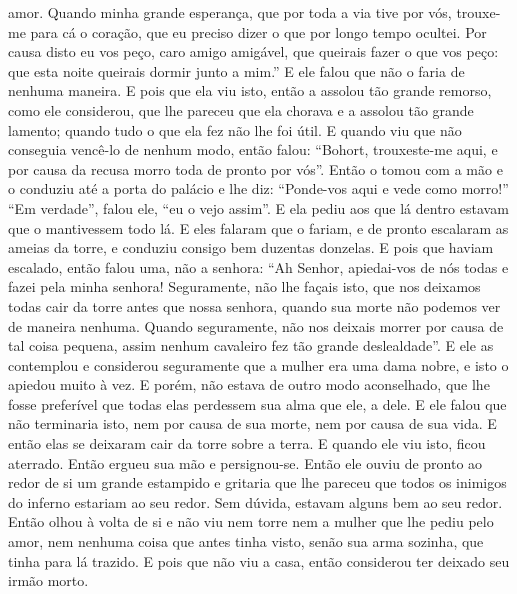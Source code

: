 amor. Quando minha grande esperança, que por toda a via tive por vós, trouxe-me
para cá o coração, que eu preciso dizer o que por longo tempo ocultei. Por
causa disto eu vos peço, caro amigo amigável, que queirais fazer o que vos
peço: que esta noite queirais dormir junto a mim.” E ele falou que não o faria
de nenhuma maneira. E pois que ela viu isto, então a assolou tão grande
remorso, como ele considerou, que lhe pareceu que ela chorava e a assolou tão
grande lamento; quando tudo o que ela fez não lhe foi útil. E quando viu que
não conseguia vencê-lo de nenhum modo, então falou: ``Bohort, trouxeste-me aqui,
e por causa da recusa morro toda de pronto por vós”. Então o tomou com a mão e
o conduziu até a porta do palácio e lhe diz: “Ponde-vos aqui e vede como
morro!” “Em verdade”, falou ele, “eu o vejo assim”. E ela pediu aos que lá
dentro estavam que o mantivessem todo lá. E eles falaram que o fariam, e de
pronto escalaram as ameias da torre, e conduziu consigo bem duzentas donzelas.
E pois que haviam escalado, então falou uma, não a senhora: “Ah Senhor,
apiedai-vos de nós todas e fazei pela minha senhora! Seguramente, não lhe
façais isto, que nos deixamos todas cair da torre antes que nossa senhora,
quando sua morte não podemos ver de maneira nenhuma. Quando
seguramente, não nos deixais morrer por causa de tal coisa pequena, assim
nenhum cavaleiro fez tão grande deslealdade”. E ele as contemplou e considerou
seguramente que a mulher era uma dama nobre, e isto o apiedou muito à vez. E
porém, não estava de outro modo aconselhado, que lhe fosse preferível que todas
elas perdessem sua alma que ele, a dele. E ele falou que não terminaria isto,
nem por causa de sua morte, nem por causa de sua vida. E então
elas se deixaram cair da torre sobre a terra. E quando ele viu isto, ficou
aterrado. Então ergueu sua mão e persignou-se. Então ele ouviu de pronto ao
redor de si um grande estampido e gritaria que lhe pareceu que todos os
inimigos do inferno estariam ao seu redor. Sem dúvida, estavam alguns bem ao
seu redor. Então olhou à volta de si e não viu nem torre nem a mulher que lhe
pediu pelo amor, nem nenhuma coisa que antes tinha visto, senão sua arma
sozinha, que tinha para lá trazido. E pois que não viu a casa, então considerou
ter deixado seu irmão morto. 

